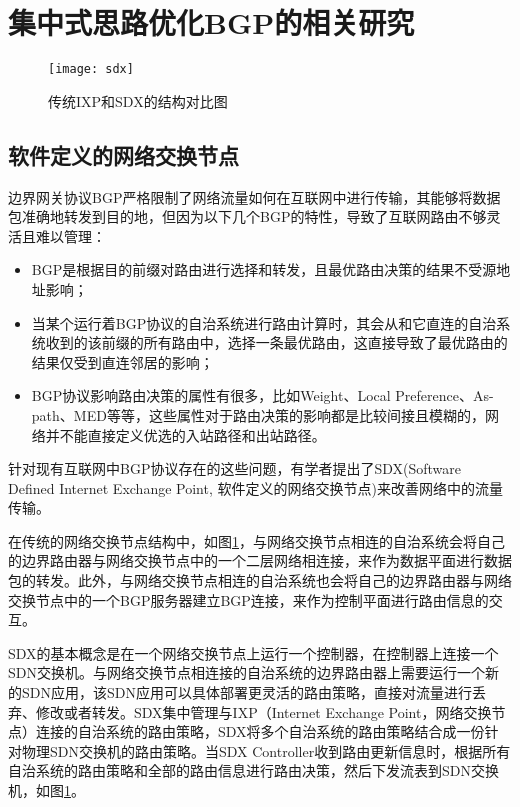 \section{集中式思路优化BGP的相关研究}

\begin{figure}
  \centering
  \texttt{[image: sdx]}
  \caption{传统IXP和SDX的结构对比图}
  \label{fig:sdx}
\end{figure}

\subsection{软件定义的网络交换节点}
边界网关协议BGP严格限制了网络流量如何在互联网中进行传输，其能够将数据包准确地转发到目的地，但因为以下几个BGP的特性，导致了互联网路由不够灵活且难以管理\cite{sdx2015sigcomm}：
\begin{itemize}
  \item BGP是根据目的前缀对路由进行选择和转发，且最优路由决策的结果不受源地址影响；
  \item 当某个运行着BGP协议的自治系统进行路由计算时，其会从和它直连的自治系统收到的该前缀的所有路由中，选择一条最优路由，这直接导致了最优路由的结果仅受到直连邻居的影响；
  \item BGP协议影响路由决策的属性有很多，比如Weight、Local Preference、As-path、MED等等，这些属性对于路由决策的影响都是比较间接且模糊的，网络并不能直接定义优选的入站路径和出站路径。
\end{itemize}

针对现有互联网中BGP协议存在的这些问题，有学者提出了SDX\cite{sdx2015sigcomm}(Software Defined Internet Exchange Point, 软件定义的网络交换节点)来改善网络中的流量传输。


在传统的网络交换节点结构中，如图\ref{fig:sdx}，与网络交换节点相连的自治系统会将自己的边界路由器与网络交换节点中的一个二层网络相连接，来作为数据平面进行数据包的转发。此外，与网络交换节点相连的自治系统也会将自己的边界路由器与网络交换节点中的一个BGP服务器建立BGP连接，来作为控制平面进行路由信息的交互。


SDX的基本概念是在一个网络交换节点上运行一个控制器，在控制器上连接一个SDN交换机。与网络交换节点相连接的自治系统的边界路由器上需要运行一个新的SDN应用，该SDN应用可以具体部署更灵活的路由策略，直接对流量进行丢弃、修改或者转发。SDX集中管理与IXP（Internet Exchange Point，网络交换节点）连接的自治系统的路由策略，SDX将多个自治系统的路由策略结合成一份针对物理SDN交换机的路由策略。当SDX Controller收到路由更新信息时，根据所有自治系统的路由策略和全部的路由信息进行路由决策，然后下发流表到SDN交换机，如图\ref{fig:sdx}。


